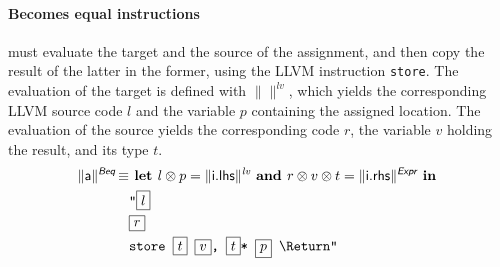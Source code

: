 \documentclass{llncs}
\newcommand{\trad}[2]{\ensuremath{\lVert \textsf{#1} \rVert^{\textit{#2}}}}
\newcommand{\nl}[0]{\text{\Return}}
\DeclareMathOperator{\conc}{\diamond}
\DeclareMathOperator{\isdef}{\equiv}
\DeclareMathOperator{\name}{\mathcal{L}()}
\newcommand{\llvm}[1]{\texttt{#1}}
\newcommand{\B}[1]{\textsf{#1}}
\newcommand{\IF}[0]{\textbf{ if }}
\newcommand{\ELSE}[0]{\textbf{ else }}
\newcommand{\THEN}[0]{\textbf{ then }}
\newcommand{\LET}[0]{\textbf{ let }}
\newcommand{\IN}[0]{\textbf{ in }}
\newcommand{\AND}[0]{\textbf{ and }}
\newcommand{\PH}[1]{\framebox{$#1$}}
\newcommand{\sep}[0]{\otimes}
\newcommand{\local}[0]{\ensuremath{\sf\lambda}}
\newcommand{\idx}[0]{\ensuremath{\sf\Pi}}
\newcommand{\state}[0]{\ensuremath{\sf\Sigma}}
\begin{document}
\paragraph{Becomes equal instructions} must evaluate the target and the source
of the assignment, and then copy the result of the latter in the former, using
the LLVM instruction \llvm{store}. The evaluation of the target is defined with
$\trad{}{lv}$, which yields the corresponding LLVM source code $l$ and the
variable $p$ containing the assigned location. The evaluation of the source
yields the corresponding code $r$, the variable $v$ holding the result, and its
type $t$.
\begin{align*}
\begin{split}
  \trad{a}{\B{Beq}} \isdef 
  & \LET l \sep p = \trad{i.lhs}{lv} \AND r \sep v \sep t = \trad{i.rhs}{\B{Expr}} \IN \\
  & \llvm{"\PH{l}} \\
  & \llvm{\PH{r}} \\
  & \llvm{store \PH{t} \PH{v}, \PH{t}* \PH{p} \nl"}
\end{split}
\end{align*}
%
\end{document}

